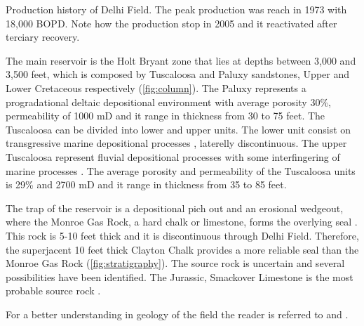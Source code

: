                   {Production history of Delhi Field. The peak production was reach in
                   1973 with 18,000 BOPD. Note how the production stop in 2005 and it 
                   reactivated after terciary recovery.}


The main reservoir is the Holt Bryant zone that lies at depths between 3,000 and 3,500
feet,  which is composed by Tuscaloosa and Paluxy sandstones, Upper and Lower Cretaceous 
respectively (\ref{fig:column}). The Paluxy represents a progradational deltaic depositional environment
 \cite{ref:nick} with average porosity 30\%, permeability of 1000 mD and it range in thickness
from 30 to 75 feet. The Tuscaloosa can be divided into lower and upper units. The lower unit 
consist on transgressive marine depositional processes \cite{ref:doug}, laterelly discontinuous.
The upper Tuscaloosa represent fluvial depositional processes with some interfingering of marine
processes \cite{ref:doug}. The average porosity and permeability of the Tuscaloosa units is 29\%
 and 2700 mD and it range in thickness from 35 to 85 feet. 

The trap of the reservoir is a  depositional pich out and an erosional wedgeout, where 
the Monroe Gas Rock, a hard chalk or  limestone, forms the overlying seal \cite{ref:powell}.
This rock is 5-10 feet thick and it is discontinuous through Delhi Field.
Therefore, the superjacent 10 feet thick Clayton Chalk provides a more reliable
seal than the Monroe Gas Rock (\ref{fig:stratigraphy}). The source rock is uncertain
and several possibilities have been identified. The Jurassic, Smackover Limestone is the
 most probable source rock \cite{ref:mancini}.

For a better understanding in geology of the field the reader is referred 
to \cite{ref:nick} and \cite{ref:doug}.



